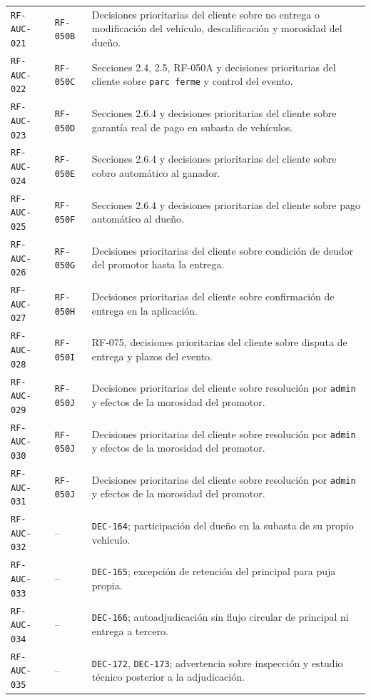 \documentclass[10pt,letterpaper]{article}
\begin{document}
\begin{landscape}
\begin{longtable}{P{2.7cm}P{2.6cm}P{15.7cm}}
\texttt{RF-AUC-021} & \texttt{RF-050B} & Decisiones prioritarias del cliente sobre no entrega o modificación del vehículo, descalificación y morosidad del dueño.\\
\texttt{RF-AUC-022} & \texttt{RF-050C} & Secciones 2.4, 2.5, RF-050A y decisiones prioritarias del cliente sobre \texttt{parc ferme} y control del evento.\\
\texttt{RF-AUC-023} & \texttt{RF-050D} & Secciones 2.6.4 y decisiones prioritarias del cliente sobre garantía real de pago en subasta de vehículos.\\
\texttt{RF-AUC-024} & \texttt{RF-050E} & Secciones 2.6.4 y decisiones prioritarias del cliente sobre cobro automático al ganador.\\
\texttt{RF-AUC-025} & \texttt{RF-050F} & Secciones 2.6.4 y decisiones prioritarias del cliente sobre pago automático al dueño.\\
\texttt{RF-AUC-026} & \texttt{RF-050G} & Decisiones prioritarias del cliente sobre condición de deudor del promotor hasta la entrega.\\
\texttt{RF-AUC-027} & \texttt{RF-050H} & Decisiones prioritarias del cliente sobre confirmación de entrega en la aplicación.\\
\texttt{RF-AUC-028} & \texttt{RF-050I} & RF-075, decisiones prioritarias del cliente sobre disputa de entrega y plazos del evento.\\
\texttt{RF-AUC-029} & \texttt{RF-050J} & Decisiones prioritarias del cliente sobre resolución por \texttt{admin} y efectos de la morosidad del promotor.\\
\texttt{RF-AUC-030} & \texttt{RF-050J} & Decisiones prioritarias del cliente sobre resolución por \texttt{admin} y efectos de la morosidad del promotor.\\
\texttt{RF-AUC-031} & \texttt{RF-050J} & Decisiones prioritarias del cliente sobre resolución por \texttt{admin} y efectos de la morosidad del promotor.\\
\texttt{RF-AUC-032} & -- & \texttt{DEC-164}; participación del dueño en la subasta de su propio vehículo.\\
\texttt{RF-AUC-033} & -- & \texttt{DEC-165}; excepción de retención del principal para puja propia.\\
\texttt{RF-AUC-034} & -- & \texttt{DEC-166}; autoadjudicación sin flujo circular de principal ni entrega a tercero.\\
\texttt{RF-AUC-035} & -- & \texttt{DEC-172}, \texttt{DEC-173}; advertencia sobre inspección y estudio técnico posterior a la adjudicación.\\

\end{longtable}
\end{landscape}
\end{document}
